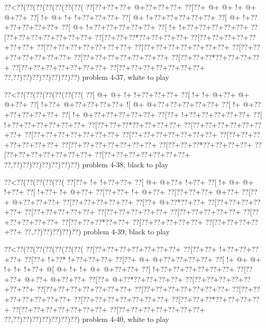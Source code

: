\vbox{\vbox{\goo
\0??<\0??(\0??(\0??(\0??(\0??(\0??(\0??(
\0??[\0??+\0??+\0??+\- @+\0??+\0??+\0??+
\0??[\0??+\- @+\- @+\- !+\- @+\- @+\0??+
\0??[\- !+\- @+\- !+\- !+\0??+\0??+\0??+
\0??[\- @+\- !+\0??+\0??+\0??+\0??+\0??+
\0??[\- @+\- !+\0??+\0??+\0??+\0??+\0??+
\0??[\- @+\- !+\0??+\0??+\0??+\0??+\0??+
\0??[\- !+\- !+\0??+\0??+\0??+\0??+\0??+
\0??[\0??+\0??+\0??+\0??+\0??+\0??+\0??+
\0??[\0??+\0??+\0??*\0??+\0??+\0??+\0??+
\0??[\0??+\0??+\0??+\0??+\0??+\0??+\0??+
\0??[\0??+\0??+\0??+\0??+\0??+\0??+\0??+
\0??[\0??+\0??+\0??+\0??+\0??+\0??+\0??+
\0??[\0??+\0??+\0??+\0??+\0??+\0??+\0??+
\0??[\0??+\0??+\0??+\0??+\0??+\0??+\0??+
\0??[\0??+\0??+\0??*\0??+\0??+\0??+\0??+
\0??[\0??+\0??+\0??+\0??+\0??+\0??+\0??+
\0??[\0??+\0??+\0??+\0??+\0??+\0??+\0??+
\0??,\0??)\0??)\0??)\0??)\0??)\0??)\0??)
}
\hfil problem 4-37, white to play\hfil\break
}

\vbox{\vbox{\goo
\0??<\0??(\0??(\0??(\0??(\0??(\0??(\0??(
\0??[\- @+\- @+\- !+\- !+\0??+\0??+\0??+
\0??[\- !+\- !+\- @+\0??+\- @+\- @+\0??+
\0??[\- !+\0??+\- @+\0??+\0??+\0??+\0??+
\- ![\- @+\- @+\0??+\0??+\0??+\0??+\0??+
\0??[\- !+\- @+\0??+\0??+\0??+\0??+\0??+
\0??[\- !+\- @+\0??+\0??+\0??+\0??+\0??+
\0??[\0??+\- !+\0??+\0??+\0??+\0??+\0??+
\0??[\- !+\0??+\0??+\0??+\0??+\0??+\0??+
\0??[\0??+\0??+\0??*\0??+\0??+\0??+\0??+
\0??[\0??+\0??+\0??+\0??+\0??+\0??+\0??+
\0??[\0??+\0??+\0??+\0??+\0??+\0??+\0??+
\0??[\0??+\0??+\0??+\0??+\0??+\0??+\0??+
\0??[\0??+\0??+\0??+\0??+\0??+\0??+\0??+
\0??[\0??+\0??+\0??+\0??+\0??+\0??+\0??+
\0??[\0??+\0??+\0??*\0??+\0??+\0??+\0??+
\0??[\0??+\0??+\0??+\0??+\0??+\0??+\0??+
\0??[\0??+\0??+\0??+\0??+\0??+\0??+\0??+
\0??,\0??)\0??)\0??)\0??)\0??)\0??)\0??)
}
\hfil problem 4-38, black to play\hfil\break
}

\vbox{\vbox{\goo
\0??<\0??(\0??(\0??(\0??(\0??(
\0??[\0??+\- !+\- !+\0??+\0??+
\0??[\- @+\- @+\0??+\- !+\0??+
\0??[\- !+\- @+\- @+\- !+\0??+
\0??[\- !+\0??+\- !+\- @+\0??+
\0??[\0??+\0??+\- !+\- @+\0??+
\0??[\0??+\0??+\0??+\- @+\0??+
\0??[\0??+\- @+\0??+\0??+\0??+
\0??[\0??+\0??+\0??+\0??+\0??+
\0??[\0??+\- @+\0??*\0??+\0??+
\0??[\0??+\0??+\0??+\0??+\0??+
\0??[\0??+\0??+\0??+\0??+\0??+
\0??[\0??+\0??+\0??+\0??+\0??+
\0??[\0??+\0??+\0??+\0??+\0??+
\0??[\0??+\0??+\0??+\0??+\0??+
\0??[\0??+\0??+\0??*\0??+\0??+
\0??[\0??+\0??+\0??+\0??+\0??+
\0??[\0??+\0??+\0??+\0??+\0??+
\0??,\0??)\0??)\0??)\0??)\0??)
}
\hfil problem 4-39, black to play\hfil\break
}

\vbox{\vbox{\goo
\0??<\0??(\0??(\0??(\0??(\0??(\0??(\0??(
\0??[\0??+\0??+\0??+\0??+\0??+\0??+\0??+
\0??[\0??+\0??+\- !+\0??+\0??+\0??+\0??+
\0??[\0??+\- !+\0??*\- !+\0??+\0??+\0??+
\0??[\0??+\- @+\- @+\0??+\0??+\0??+\0??+
\0??[\- !+\- @+\- @+\- !+\- !+\- !+\0??+
\- @[\- @+\- !+\- !+\- @+\- @+\0??+\0??+
\0??[\- !+\0??+\0??+\0??+\0??+\0??+\0??+
\0??[\0??+\0??+\- @+\0??+\- @+\0??+\0??+
\0??[\0??+\- @+\0??*\0??+\0??+\0??+\0??+
\0??[\0??+\0??+\0??+\0??+\0??+\0??+\0??+
\0??[\0??+\0??+\0??+\0??+\0??+\0??+\0??+
\0??[\0??+\0??+\0??+\0??+\0??+\0??+\0??+
\0??[\0??+\0??+\0??+\0??+\0??+\0??+\0??+
\0??[\0??+\0??+\0??+\0??+\0??+\0??+\0??+
\0??[\0??+\0??+\0??*\0??+\0??+\0??+\0??+
\0??[\0??+\0??+\0??+\0??+\0??+\0??+\0??+
\0??[\0??+\0??+\0??+\0??+\0??+\0??+\0??+
\0??,\0??)\0??)\0??)\0??)\0??)\0??)\0??)
}
\hfil problem 4-40, white to play\hfil\break
}

